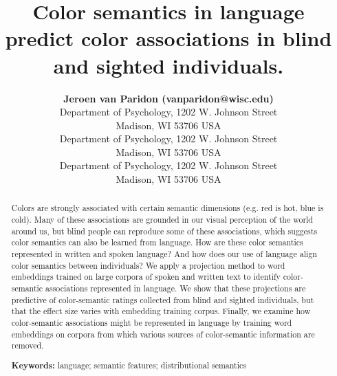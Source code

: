 \documentclass[10pt,letterpaper]{article}
\title{Color semantics in language predict color associations in blind and sighted individuals.}
\author{{\large \bf Jeroen van Paridon (vanparidon@wisc.edu)} \\
  Department of Psychology, 1202 W. Johnson Street \\
  Madison, WI 53706 USA
  \AND {\large \bf Ella Qiawen Liu (qliu295@wisc.edu)} \\
  Department of Psychology, 1202 W. Johnson Street \\
  Madison, WI 53706 USA
  \AND {\large \bf Gary Lupyan (lupyan@wisc.edu)} \\
  Department of Psychology, 1202 W. Johnson Street \\
  Madison, WI 53706 USA}
\begin{document}
\maketitle


\begin{abstract}
Colors are strongly associated with certain semantic dimensions (e.g. red is hot, blue is cold). Many of these associations are grounded in our visual perception of the world around us, but blind people can reproduce some of these associations, which suggests color semantics can also be learned from language. How are these color semantics represented in written and spoken language? And how does our use of language align color semantics between individuals?
We apply a projection method to word embeddings trained on large corpora of spoken and written text to identify color-semantic associations represented in language. We show that these projections are predictive of color-semantic ratings collected from blind and sighted individuals, but that the effect size varies with embedding training corpus. Finally, we examine how color-semantic associations might be represented in language by training word embeddings on corpora from which various sources of color-semantic information are removed.

\textbf{Keywords:}
language; semantic features; distributional semantics
\end{abstract}
\end{document}
